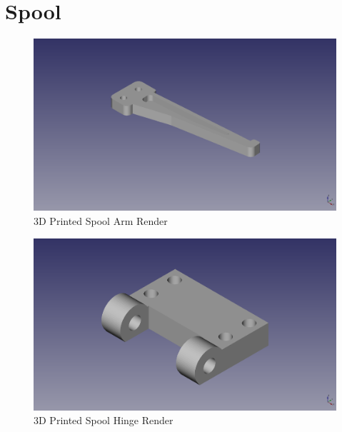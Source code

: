 \section{Spool}

\begin{figure}[H]
\centering
\includegraphics[keepaspectratio=true,angle=0,height=1.0\textheight,width=1.0\textwidth]{STL/spoolarm.stl.png}
\caption{3D Printed Spool Arm Render}
\label{fig:spoolarmrender}
\end{figure}

\begin{figure}[H]
\centering
\includegraphics[keepaspectratio=true,angle=0,height=1.0\textheight,width=1.0\textwidth]{STL/spoolhinge.stl.png}
\caption{3D Printed Spool Hinge Render}
\label{fig:spoolhingerender}
\end{figure}

